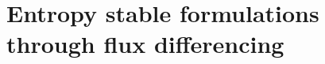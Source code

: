 \documentclass[compress]{beamer}
\theoremstyle{plain}
\renewcommand\hat{\widehat}
\newcommand{\td}[2]{\frac{{\rm d}#1}{{\rm d}#2}}
\newcommand{\pd}[2]{\frac{\partial #1}{\partial #2}}
\newcommand{\nor}[1]{\left\| #1 \right\|}
\newcommand{\LRp}[1]{\left( #1 \right)}
\newcommand{\LRs}[1]{\left[ #1 \right]}
\renewcommand{\note}[1]{\textcolor{red}{{#1}}}
\begin{document}
\section{Entropy stable formulations through flux differencing}

%

\end{document}
